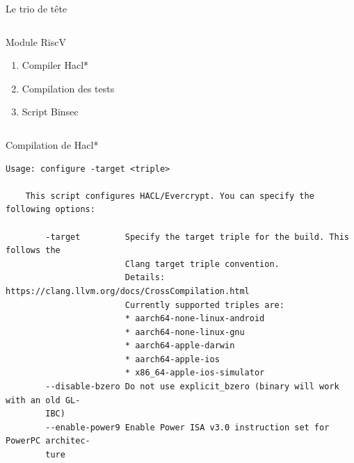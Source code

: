 \documentclass[A4,svgnames,9pt,aspectratio=169]{beamer}
\begin{document}
\begin{frame}{Le trio de tête}
\begin{columns}
\begin{column}{0.5\textwidth}
{        \begin{block}{Module RiscV}
          \begin{enumerate}
            \item Compiler Hacl*
            \item[\checkmark] Compilation des tests
            \item[\checkmark] Script Binsec
          \end{enumerate}
        \end{block}
      }
    \end{column}
  \end{columns}
\end{frame}



\begin{frame}[fragile]{Compilation de Hacl*}

  \begin{lstlisting}[style=global2, caption={./configure}, gobble=4]
    Usage: configure -target <triple>

    This script configures HACL/Evercrypt. You can specify the following options:

        -target         Specify the target triple for the build. This follows the
                        Clang target triple convention.
                        Details: https://clang.llvm.org/docs/CrossCompilation.html
                        Currently supported triples are:
                        * aarch64-none-linux-android
                        * aarch64-none-linux-gnu
                        * aarch64-apple-darwin
                        * aarch64-apple-ios
                        * x86_64-apple-ios-simulator
        --disable-bzero Do not use explicit_bzero (binary will work with an old GL-
        IBC)
        --enable-power9 Enable Power ISA v3.0 instruction set for PowerPC architec-
        ture
  \end{lstlisting}
\end{frame}

\end{document}
